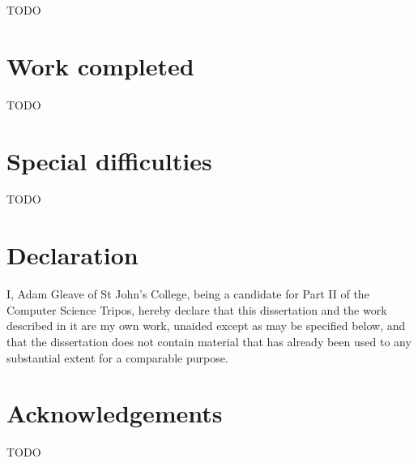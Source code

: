 \documentclass[12pt,a4paper,twoside,notitlepage]{report}
\theoremstyle{definition}
\begin{document}
TODO

\vspace*{-1em}
\section*{Work completed}

TODO

\vspace*{-1em}
\section*{Special difficulties}

TODO

\newpage

\section*{Declaration}

I, Adam Gleave of St John's College, being a candidate for Part II of the 
Computer Science Tripos, hereby declare that this dissertation and the work 
described in it are my own work, unaided except as may be specified below, and
that the dissertation does not contain material that has already been used to
any substantial extent for a comparable purpose.

\bigskip
{}
\medskip
{}

\clearpage

\tableofcontents

\listoffigures

\newpage
\section*{Acknowledgements}

TODO

\clearpage	%

\setcounter{page}{1}
\pagestyle{headings}



\cleardoublepage


\cleardoublepage


\cleardoublepage


\cleardoublepage


\cleardoublepage
\end{document}
